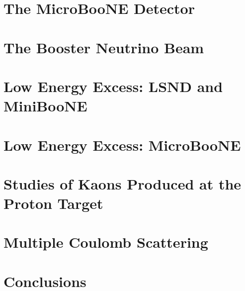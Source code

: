 \documentclass[11pt,openright,twoside,letterpaper,onecolumn]{report} %
\begin{document}
\chapter{The MicroBooNE Detector}
\label{sec:detector}


\chapter{The Booster Neutrino Beam}
\label{sec:beam}


\chapter{Low Energy Excess: LSND and MiniBooNE}
\label{sec:LEEhistory}


\chapter{Low Energy Excess: MicroBooNE}
\label{sec:LEEsensitivity}


\chapter{Studies of Kaons Produced at the Proton Target}
\label{sec:kaon}


\chapter{Multiple Coulomb Scattering}
\label{sec:MCS}


\chapter{Conclusions}
\label{sec:conclusions}



 

\end{document}
